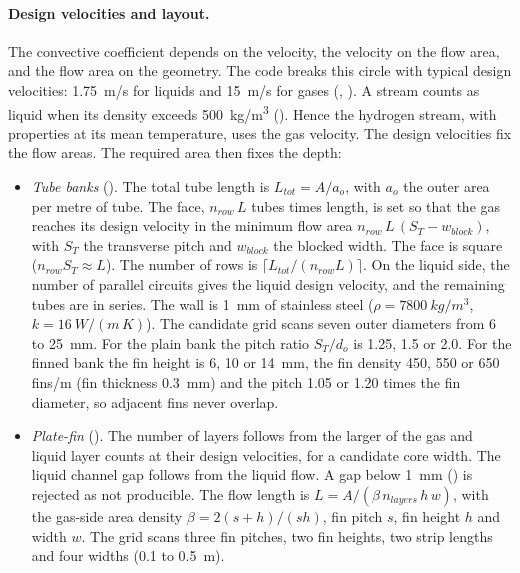 \documentclass[a4paper,11pt]{article}
\begin{document}
\paragraph{Design velocities and layout.} The convective coefficient depends on the
velocity, the velocity on the flow area, and the flow area on the geometry. The code breaks
this circle with typical design velocities: \SI{1.75}{m/s} for liquids and \SI{15}{m/s}
for gases (, ). A stream counts as
liquid when its density exceeds \SI{500}{kg/m^3} (). Hence the
hydrogen stream, with properties at its mean temperature, uses the gas velocity. The
design velocities fix the flow areas. The required area then fixes the depth:
\begin{itemize}
\item \emph{Tube banks} (). The total tube length is
  $L_{tot} = A/a_o$, with $a_o$ the outer area per metre of tube. The face, $n_{row}\,L$
  tubes times length, is set so that the gas reaches its design velocity in the minimum
  flow area $n_{row}\,L\,(S_T - w_{block})$, with $S_T$ the transverse pitch and $w_{block}$
  the blocked width. The face is square ($n_{row} S_T \approx L$). The number of rows is
  $\lceil L_{tot}/(n_{row} L)\rceil$. On the liquid side, the number of parallel circuits
  gives the liquid design velocity, and the remaining tubes are in series. The wall is
  \SI{1}{mm} of stainless steel ($\rho = \SI{7800}{kg/m^3}$, $k = \SI{16}{W/(m\,K)}$). The
  candidate grid scans seven outer diameters from 6 to \SI{25}{mm}. For the plain bank the
  pitch ratio $S_T/d_o$ is 1.25, 1.5 or 2.0. For the finned bank the fin height is 6, 10 or
  \SI{14}{mm}, the fin density 450, 550 or 650 fins/m (fin thickness \SI{0.3}{mm}) and the
  pitch 1.05 or 1.20 times the fin diameter, so adjacent fins never overlap.
\item \emph{Plate-fin} (). The number of layers follows from the
  larger of the gas and liquid layer counts at their design velocities, for a candidate
  core width. The liquid channel gap follows from the liquid flow. A gap below
  \SI{1}{mm} () is rejected as not producible. The flow length is
  $L = A/(\beta\,n_{layers}\,h\,w)$, with the gas-side area density
  $\beta = 2(s+h)/(sh)$, fin pitch $s$, fin height $h$ and width $w$. The grid scans three
  fin pitches, two fin heights, two strip lengths and four widths (0.1 to \SI{0.5}{m}).
\end{itemize}
\end{document}
